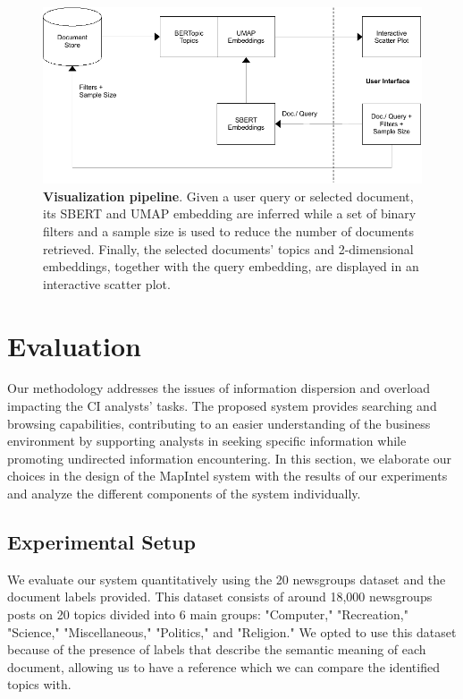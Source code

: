 \documentclass[a4paper]{article}
\begin{document}
\begin{figure}[H]
	\centering
	\includegraphics[width=\linewidth]{./assets/vis_pipeline}
	\caption{\textbf{Visualization pipeline}. Given a user query or selected document, its SBERT and UMAP embedding are inferred while a set of binary filters and a sample size is used to reduce the number of documents retrieved. Finally, the selected documents' topics and 2-dimensional embeddings, together with the query embedding, are displayed in an interactive scatter plot.}
	\label{vis_pipeline}
\end{figure}

\section{Evaluation}
Our methodology addresses the issues of information dispersion and overload impacting the CI analysts' tasks. The proposed system provides searching and browsing capabilities, contributing to an easier understanding of the business environment by supporting analysts in seeking specific information while promoting undirected information encountering. In this section, we elaborate our choices in the design of the MapIntel system with the results of our experiments and analyze the different components of the system individually.

\subsection{Experimental Setup}
We evaluate our system quantitatively using the 20 newsgroups \citep{pedregosa2011} dataset and the document labels provided. This dataset consists of around 18,000 newsgroups posts on 20 topics divided into 6 main groups: "Computer," "Recreation," "Science," "Miscellaneous," "Politics," and "Religion." We opted to use this dataset because of the presence of labels that describe the semantic meaning of each document, allowing us to have a reference which we can compare the identified topics with.
\end{document}
